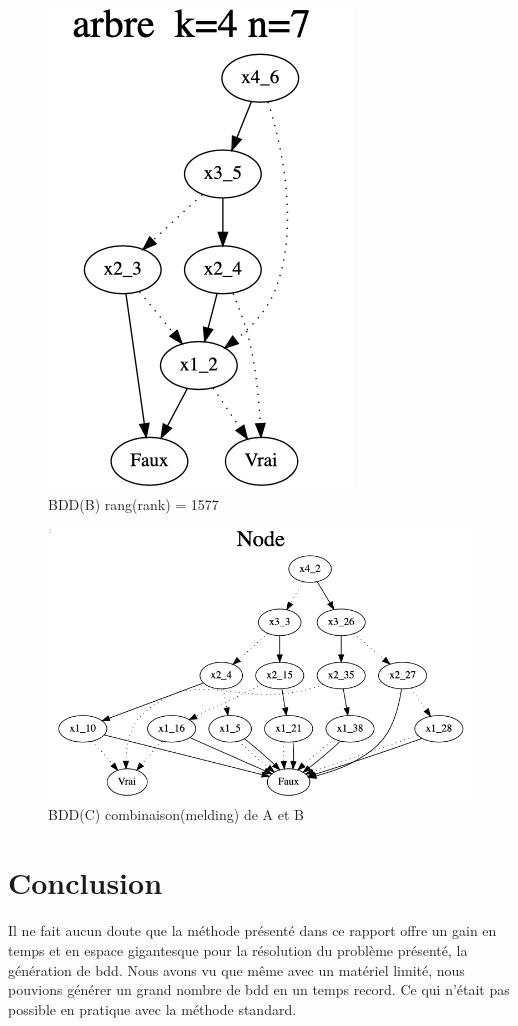 \documentclass[french]{article}
\begin{document}
\begin{figure}[h!]
    \centering
    \includegraphics[scale=0.4]{arb_1577.png}
    \caption{BDD(B) rang(rank) = 1577}
    \label{fig:graphe_B}
\end{figure}

\begin{figure}[h!]
    \centering
    \includegraphics[scale=0.4]{abr_melding_C.png}
    \caption{BDD(C) combinaison(melding) de A et B}
    \label{fig:graphe_C}
\end{figure}

\newpage
\section{Conclusion}
Il ne fait aucun doute que la méthode présenté dans ce rapport offre un gain en temps et en espace gigantesque pour la résolution du problème présenté, la génération de bdd. Nous avons vu que même avec un matériel limité, nous pouvions générer un grand nombre de bdd en un temps record. Ce qui n'était pas possible en pratique avec la méthode standard. 
\vspace{5mm} 
\end{document}
